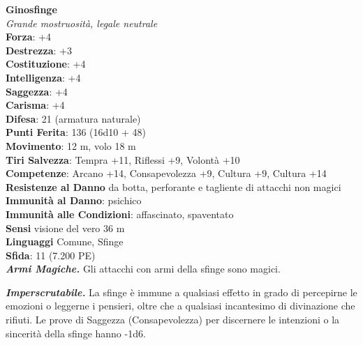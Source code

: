 \begin{multicols}{2}
\medskip\textbf{Ginosfinge}\\
\emph{Grande mostruosità, legale neutrale}\\
\textbf{Forza}: +4\\
\textbf{Destrezza}: +3\\
\textbf{Costituzione}: +4\\
\textbf{Intelligenza}: +4\\
\textbf{Saggezza}: +4\\
\textbf{Carisma}: +4\\
\textbf{Difesa}: 21 (armatura naturale)\\
\textbf{Punti Ferita}: 136 (16d10 + 48)\\
\textbf{Movimento}: 12 m, volo 18 m\\
\textbf{Tiri Salvezza}: Tempra +11, Riflessi +9, Volontà +10\\
\textbf{Competenze}: Arcano +14, Consapevolezza +9, Cultura +9, Cultura +14\\
\textbf{Resistenze al Danno} da botta, perforante e tagliente di attacchi non magici\\
\textbf{Immunità al Danno}: psichico\\
\textbf{Immunità alle Condizioni}: affascinato, spaventato\\
\textbf{Sensi} visione del vero 36 m\\
\textbf{Linguaggi} Comune, Sfinge\\
\textbf{Sfida}: 11 (7.200 PE)\smallskip\\
\emph{\textbf{Armi Magiche.}} Gli attacchi con armi della sfinge sono magici.

\emph{\textbf{Imperscrutabile.}} La sfinge è immune a qualsiasi effetto in grado di percepirne le emozioni o leggerne i pensieri, oltre che a qualsiasi incantesimo di divinazione che rifiuti. Le prove di Saggezza (Consapevolezza) per discernere le intenzioni o la sincerità della sfinge
hanno -1d6.\\


\end{multicols}
